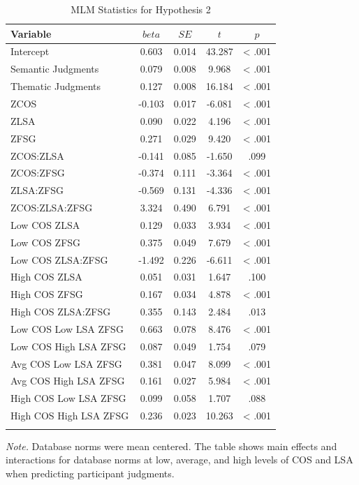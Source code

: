 \documentclass[english,,man]{apa6}
\begin{document}
\begin{table}[tbp]
\begin{center}
\begin{threeparttable}
\caption{\label{tab:hyp2-table}MLM Statistics for Hypothesis 2}
\small{
\begin{tabular}{lcccc}
\toprule
Variable & \multicolumn{1}{c}{$beta$} & \multicolumn{1}{c}{$SE$} & \multicolumn{1}{c}{$t$} & \multicolumn{1}{c}{$p$}\\
\midrule
Intercept & 0.603 & 0.014 & 43.287 & < .001\\
Semantic Judgments & 0.079 & 0.008 & 9.968 & < .001\\
Thematic Judgments & 0.127 & 0.008 & 16.184 & < .001\\
ZCOS & -0.103 & 0.017 & -6.081 & < .001\\
ZLSA & 0.090 & 0.022 & 4.196 & < .001\\
ZFSG & 0.271 & 0.029 & 9.420 & < .001\\
ZCOS:ZLSA & -0.141 & 0.085 & -1.650 & .099\\
ZCOS:ZFSG & -0.374 & 0.111 & -3.364 & < .001\\
ZLSA:ZFSG & -0.569 & 0.131 & -4.336 & < .001\\
ZCOS:ZLSA:ZFSG & 3.324 & 0.490 & 6.791 & < .001\\
Low COS ZLSA & 0.129 & 0.033 & 3.934 & < .001\\
Low COS ZFSG & 0.375 & 0.049 & 7.679 & < .001\\
Low COS ZLSA:ZFSG & -1.492 & 0.226 & -6.611 & < .001\\
High COS ZLSA & 0.051 & 0.031 & 1.647 & .100\\
High COS ZFSG & 0.167 & 0.034 & 4.878 & < .001\\
High COS ZLSA:ZFSG & 0.355 & 0.143 & 2.484 & .013\\
Low COS Low LSA ZFSG & 0.663 & 0.078 & 8.476 & < .001\\
Low COS High LSA ZFSG & 0.087 & 0.049 & 1.754 & .079\\
Avg COS Low LSA ZFSG & 0.381 & 0.047 & 8.099 & < .001\\
Avg COS High LSA ZFSG & 0.161 & 0.027 & 5.984 & < .001\\
High COS Low LSA ZFSG & 0.099 & 0.058 & 1.707 & .088\\
High COS High LSA ZFSG & 0.236 & 0.023 & 10.263 & < .001\\
\bottomrule
\addlinespace
\end{tabular}
}
\begin{tablenotes}[para]
\normalsize{\textit{Note.} Database norms were mean centered. The table shows main effects and interactions for database norms at low, average, and high levels of COS and LSA when predicting participant judgments.}
\end{tablenotes}
\end{threeparttable}
\end{center}
\end{table}
\end{document}
